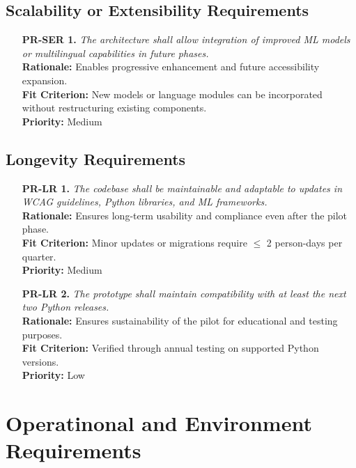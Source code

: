 \documentclass[12pt]{article}
\begin{document}
\subsection{Scalability or Extensibility Requirements}
\begin{itemize}
    \item[\textbf{PR-SER 1.}] \textit{The architecture shall allow integration of improved ML models or multilingual capabilities in future phases.}\\
    \textbf{Rationale:} Enables progressive enhancement and future accessibility expansion.\\
    \textbf{Fit Criterion:} New models or language modules can be incorporated without restructuring existing components.\\
    \textbf{Priority:} Medium
\end{itemize}

\subsection{Longevity Requirements}
\begin{itemize}
    \item[\textbf{PR-LR 1.}] \textit{The codebase shall be maintainable and adaptable to updates in WCAG guidelines, Python libraries, and ML frameworks.}\\
    \textbf{Rationale:} Ensures long-term usability and compliance even after the pilot phase.\\
    \textbf{Fit Criterion:} Minor updates or migrations require $\leq$ 2 person-days per quarter.\\
    \textbf{Priority:} Medium

    \item[\textbf{PR-LR 2.}] \textit{The prototype shall maintain compatibility with at least the next two Python releases.}\\
    \textbf{Rationale:} Ensures sustainability of the pilot for educational and testing purposes.\\
    \textbf{Fit Criterion:} Verified through annual testing on supported Python versions.\\
    \textbf{Priority:} Low
\end{itemize}

\section{Operatinonal and Environment Requirements}
\end{document}
